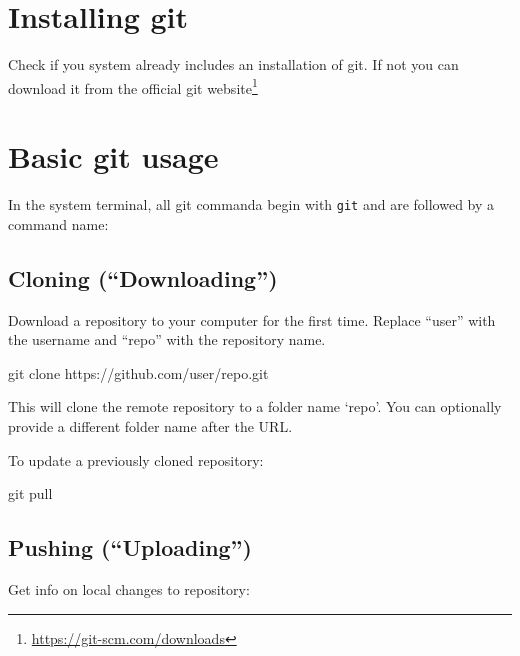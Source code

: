 \documentclass[
]{book}
\newenvironment{Shaded}{\begin{snugshade}}{\end{snugshade}}
\newcommand{\FunctionTok}[1]{\textcolor[rgb]{0.00,0.00,0.00}{#1}}
\newcommand{\NormalTok}[1]{#1}
\renewcommand{\href}[2]{#2\footnote{\url{#1}}}
\begin{document}
\hypertarget{installing-git}{%
\section{Installing git}\label{installing-git}}

Check if you system already includes an installation of git. If not you can download it from the official \href{https://git-scm.com/downloads}{git website}

\hypertarget{basic-git-usage}{%
\section{Basic git usage}\label{basic-git-usage}}

In the system terminal, all git commanda begin with \texttt{git} and are followed by a command name:

\hypertarget{cloning-downloading}{%
\subsection{Cloning (``Downloading'')}\label{cloning-downloading}}

Download a repository to your computer for the first time. Replace ``user'' with the username and ``repo'' with the repository name.

\begin{Shaded}
\begin{Highlighting}[]
\FunctionTok{git}\NormalTok{ clone https://github.com/user/repo.git}
\end{Highlighting}
\end{Shaded}

This will clone the remote repository to a folder name `repo'. You can optionally provide a different folder name after the URL.

To update a previously cloned repository:

\begin{Shaded}
\begin{Highlighting}[]
\FunctionTok{git}\NormalTok{ pull}
\end{Highlighting}
\end{Shaded}

\hypertarget{pushing-uploading}{%
\subsection{Pushing (``Uploading'')}\label{pushing-uploading}}

Get info on local changes to repository:
\end{document}
